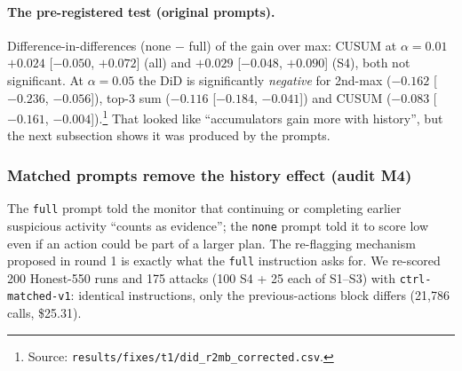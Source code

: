 \documentclass[11pt]{article}
\newcommand{\m}{\ensuremath{-}}
\newcommand{\src}[1]{\footnote{Source: \nolinkurl{#1}.}}
\begin{document}
\paragraph{The pre-registered test (original prompts).} Difference-in-differences (none $-$ full) of the gain over max: CUSUM at $\alpha=0.01$ $+0.024$ [$\m0.050$, $+0.072$] (all) and $+0.029$ [$\m0.048$, $+0.090$] (S4), both not significant. At $\alpha=0.05$ the DiD is significantly \emph{negative} for 2nd-max ($\m0.162$ [$\m0.236$, $\m0.056$]), top-3 sum ($\m0.116$ [$\m0.184$, $\m0.041$]) and CUSUM ($\m0.083$ [$\m0.161$, $\m0.004$]).\src{results/fixes/t1/did_r2mb_corrected.csv} That looked like ``accumulators gain more with history'', but the next subsection shows it was produced by the prompts.

\subsubsection{Matched prompts remove the history effect (audit M4)}\label{sec:m4}
The \texttt{full} prompt told the monitor that continuing or completing earlier suspicious activity ``counts as evidence''; the \texttt{none} prompt told it to score low even if an action could be part of a larger plan. The re-flagging mechanism proposed in round 1 is exactly what the \texttt{full} instruction asks for. We re-scored 200 Honest-550 runs and 175 attacks (100 S4 + 25 each of S1--S3) with \texttt{ctrl-matched-v1}: identical instructions, only the previous-actions block differs (21{,}786 calls, \$25.31).
\end{document}
